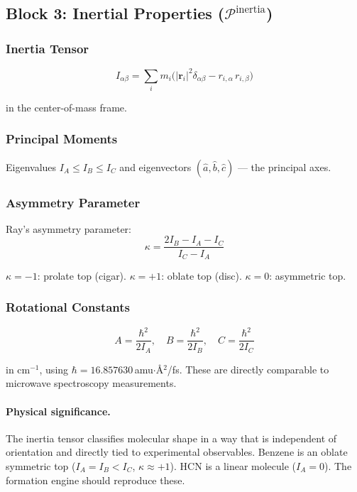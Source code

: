 \documentclass[11pt, a4paper, oneside]{article}
\theoremstyle{definition}
\theoremstyle{remark}
\begin{document}
\subsection{Block 3: Inertial Properties ($\mathcal{P}^{\text{inertia}}$)}
\label{sec:block-inertia}

\subsubsection{Inertia Tensor}

\begin{equation}
I_{\alpha\beta} = \sum_i m_i\bigl(
  |\mathbf{r}_i|^2 \delta_{\alpha\beta} - r_{i,\alpha}\, r_{i,\beta}
\bigr)
\end{equation}

in the center-of-mass frame.

\subsubsection{Principal Moments}

Eigenvalues $I_A \leq I_B \leq I_C$ and eigenvectors
$(\hat{a}, \hat{b}, \hat{c})$ — the principal axes.

\subsubsection{Asymmetry Parameter}

Ray's asymmetry parameter:
\begin{equation}
\kappa = \frac{2I_B - I_A - I_C}{I_C - I_A}
\end{equation}

$\kappa = -1$: prolate top (cigar).  $\kappa = +1$: oblate top (disc).
$\kappa = 0$: asymmetric top.

\subsubsection{Rotational Constants}

\begin{equation}
A = \frac{\hbar^2}{2 I_A}, \quad
B = \frac{\hbar^2}{2 I_B}, \quad
C = \frac{\hbar^2}{2 I_C}
\end{equation}

in cm$^{-1}$, using $\hbar = 16.857630$\,amu$\cdot$\AA$^2$/fs.
These are directly comparable to microwave spectroscopy measurements.

\paragraph{Physical significance.}
The inertia tensor classifies molecular shape in a way that is
independent of orientation and directly tied to experimental
observables.  Benzene is an oblate symmetric top ($I_A = I_B < I_C$,
$\kappa \approx +1$).  HCN is a linear molecule ($I_A = 0$).
The formation engine should reproduce these.
\end{document}

